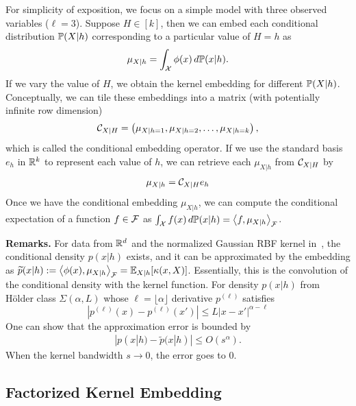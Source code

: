 \documentclass{article}
\begin{document}
For simplicity of exposition, we focus on a simple model with three observed variables ($\ell=3$). Suppose $H\in[k]$, then we can embed each conditional distribution $\mathbb{P}(X|h)$ corresponding to a particular value of $H=h$ as
\begin{align}
  \mu_{X|h} = \int_{\mathcal{X}} \phi(x)\, d \mathbb{P}(x | h).
\end{align}
If we vary the value of $H$, we  obtain the kernel embedding for different $\mathbb{P}(X|h)$. Conceptually, we can tile these embeddings into a matrix (with potentially infinite row dimension)
\begin{align}
  \mathcal{C}_{X|H} = \left(\mu_{X|h=1},\mu_{X|h=2},\ldots,\mu_{X|h=k}\right),
\end{align}
which is called the conditional embedding operator. If we use the standard basis $e_h$ in $\mathbb{R}^k$ to represent each value of $h$, we can retrieve each $\mu_{X|h}$ from $\mathcal{C}_{X|H}$ by
\begin{align}
  \mu_{X|h} = \mathcal{C}_{X|H} e_h
\end{align}
Once we have the conditional embedding $\mu_{X|h}$, we can compute the conditional expectation of a function $f\in \mathcal{F}$ as $\int_{\mathcal{X}} f(x) \,d\mathbb{P}(x|h)  = \left\langle f,\mu_{X|h} \right\rangle_{\mathcal{F}}$.

{\bf Remarks.} For data from $\mathbb{R}^d$ and the normalized Gaussian RBF kernel in~, the conditional density $p(x|h)$ exists, and it can be approximated by the embedding as $\widetilde{p}(x|h) := \left\langle \phi(x),\mu_{X|h} \right\rangle_{\mathcal{F}}=\mathbb{E}_{X|h}[\kappa(x,X)]$. Essentially, this is the convolution of the conditional density with the kernel function. For density $p(x|h)$ from H\"older class $\Sigma(\alpha, L)$ whose $\ell=\lfloor\alpha\rfloor$ derivative $p^{(\ell)}$ satisfies ~\cite{Tsybakov09}
$$
	|p^{(\ell)}(x)-p^{(\ell)}(x')|\leq L|x-x'|^{\alpha-\ell}
$$
One can show that the approximation error is bounded by
\begin{align}
  |p(x|h) - \widetilde p(x|h)| \leq O(s^\alpha).
	\label{eq:kdebias}
\end{align}
When the kernel bandwidth $s \rightarrow 0$, the error goes to 0.

\vspace{-3mm}
\subsection{Factorized Kernel Embedding}
\vspace{-2mm}
\end{document}
